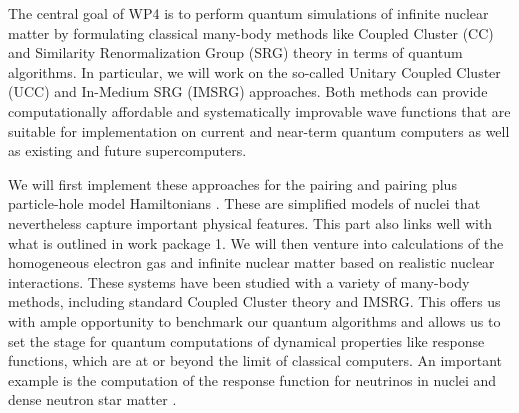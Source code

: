 \documentclass[11pt]{article}
\begin{document}
The central goal of WP4 is to perform quantum simulations of infinite nuclear matter by formulating classical many-body methods like Coupled Cluster (CC) and Similarity Renormalization Group (SRG) theory in terms of quantum algorithms. In particular, we will work on the so-called Unitary Coupled Cluster (UCC) and In-Medium SRG (IMSRG) approaches. Both methods can provide computationally affordable and systematically improvable wave functions that are suitable for implementation on current and near-term quantum computers as well as existing and future supercomputers. 

We will first implement these approaches for the pairing and pairing plus particle-hole model Hamiltonians \cite{Hjorth-Jensen:2010qf}. These are simplified models of nuclei that nevertheless capture important physical features. This part also links well with what is outlined in work package 1. We will then venture into calculations of the homogeneous electron gas and infinite nuclear matter based on realistic nuclear interactions. These systems have been studied with a variety of many-body methods, including standard Coupled Cluster theory and IMSRG. This offers us with ample opportunity to benchmark our quantum algorithms and allows us to set the stage for quantum computations of dynamical properties like response functions, which are at or beyond the limit of classical computers. An important example is the computation of the response function for neutrinos in nuclei and dense neutron star matter \cite{Rocco:2018mwt}.
\end{document}
